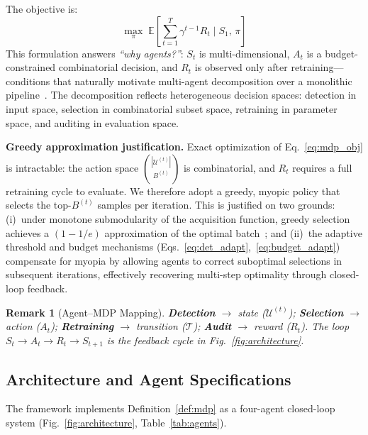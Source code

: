 \documentclass[review,1p,times,number]{elsarticle}
\newtheorem{remark}{Remark}
\begin{document}
The objective is:
\begin{equation}
  \max_{\pi} \;\mathbb{E}\!\left[\sum_{t=1}^{T} \gamma^{t-1} R_t
  \;\Big|\; S_1,\, \pi\right]
  \label{eq:mdp_obj}
\end{equation}
This formulation answers \textit{``why agents?''}: $S_t$ is
multi-dimensional, $A_t$ is a budget-constrained combinatorial
decision, and $R_t$ is observed only after retraining---conditions
that naturally motivate multi-agent decomposition over a monolithic
pipeline~\cite{wang2024agents}. The decomposition reflects
heterogeneous decision spaces: detection in input space, selection in
combinatorial subset space, retraining in parameter space, and auditing
in evaluation space.

\textbf{Greedy approximation justification.}
Exact optimization of Eq.~\eqref{eq:mdp_obj} is intractable: the
action space $\binom{|\mathcal{U}^{(t)}|}{B^{(t)}}$ is combinatorial,
and $R_t$ requires a full retraining cycle to evaluate. We therefore
adopt a greedy, myopic policy that selects the top-$B^{(t)}$ samples
per iteration. This is justified on two grounds:
(i)~under monotone submodularity of the acquisition function,
greedy selection achieves a $(1{-}1/e)$ approximation of the
optimal batch~\cite{nemhauser1978analysis}; and
(ii)~the adaptive threshold and budget mechanisms
(Eqs.~\ref{eq:det_adapt},~\ref{eq:budget_adapt}) compensate for
myopia by allowing agents to correct suboptimal selections in
subsequent iterations, effectively recovering multi-step optimality
through closed-loop feedback.

\begin{remark}[Agent--MDP Mapping]
\textbf{Detection} $\to$ state ($\mathcal{U}^{(t)}$);
\textbf{Selection} $\to$ action ($A_t$);
\textbf{Retraining} $\to$ transition ($\mathcal{T}$);
\textbf{Audit} $\to$ reward ($R_t$).
The loop $S_t \to A_t \to R_t \to S_{t+1}$ is the feedback cycle in
Fig.~\ref{fig:architecture}.
\end{remark}

\subsection{Architecture and Agent Specifications}
\label{sec:architecture}

The framework implements Definition~\ref{def:mdp} as a four-agent
closed-loop system (Fig.~\ref{fig:architecture},
Table~\ref{tab:agents}).
\end{document}
